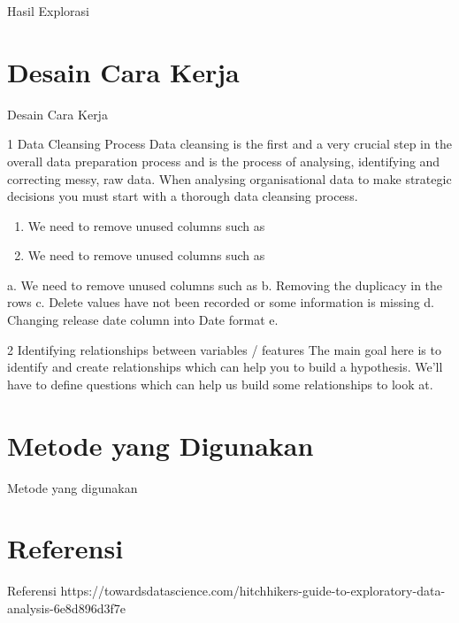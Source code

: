 \documentclass{article}
\begin{document}
\begin{normalsize}
        Hasil Explorasi

        \section{Desain Cara Kerja}

        Desain Cara Kerja

        1 Data Cleansing Process
        Data cleansing is the first and a very crucial step in the overall data preparation
        process and is the process of analysing, identifying and correcting messy, raw data.
        When analysing organisational data to make strategic decisions you must start with
        a thorough data cleansing process.

        \begin{enumerate}[label=\alph*.]
            \item We need to remove unused columns such as
            \item We need to remove unused columns such as  
        \end{enumerate}
        a. We need to remove unused columns such as
        b. Removing the duplicacy in the rows
        c. Delete values have not been recorded or some information is missing
        d. Changing release date column into Date format
        e. 

        2 Identifying relationships between variables / features
        The main goal here is to identify and create relationships which can help you to build a hypothesis. 
        We’ll have to define questions which can help us build some relationships to look at.
        
        \section{Metode yang Digunakan}

        Metode yang digunakan

        \section{Referensi}

        Referensi
        https://towardsdatascience.com/hitchhikers-guide-to-exploratory-data-analysis-6e8d896d3f7e
    \end{normalsize}
  
\end{document}
